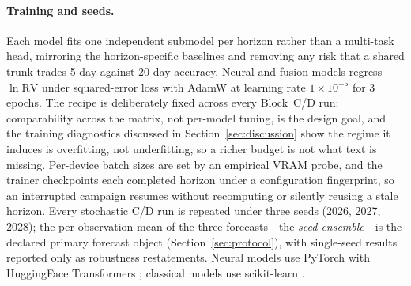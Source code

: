 \paragraph{Training and seeds.}
Each model fits one independent submodel per horizon rather than a multi-task head, mirroring the horizon-specific baselines and removing any risk that a shared trunk trades 5-day against 20-day accuracy. Neural and fusion models regress $\ln\mathrm{RV}$ under squared-error loss with AdamW at learning rate $1\times10^{-5}$ for 3 epochs. The recipe is deliberately fixed across every Block~C/D run: comparability across the matrix, not per-model tuning, is the design goal, and the training diagnostics discussed in Section~\ref{sec:discussion} show the regime it induces is overfitting, not underfitting, so a richer budget is not what text is missing. Per-device batch sizes are set by an empirical VRAM probe, and the trainer checkpoints each completed horizon under a configuration fingerprint, so an interrupted campaign resumes without recomputing or silently reusing a stale horizon. Every stochastic C/D run is repeated under three seeds (2026, 2027, 2028); the per-observation mean of the three forecasts---the \emph{seed-ensemble}---is the declared primary forecast object (Section~\ref{sec:protocol}), with single-seed results reported only as robustness restatements. Neural models use PyTorch \citep{paszke2019pytorch} with HuggingFace Transformers \citep{wolf2020transformers}; classical models use scikit-learn \citep{pedregosa2011sklearn}.

